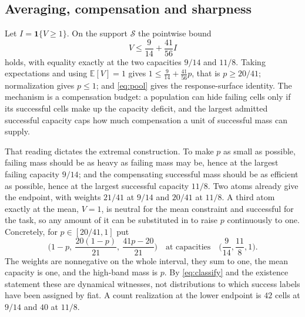\documentclass[11pt]{article}
\theoremstyle{definition}
\newcommand{\E}{\mathbb E}
\newcommand{\ind}{\mathbf 1}
\begin{document}
\subsection{Averaging, compensation and sharpness}
Let $I=\ind\{V\ge1\}$. On the support $\mathcal S$ the pointwise bound
\begin{equation}\label{eq:majorant}
  V\le\frac9{14}+\frac{41}{56}I
\end{equation}
holds, with equality exactly at the two capacities $9/14$ and $11/8$. Taking
expectations and using $\E[V]=1$ gives $1\le\frac9{14}+\frac{41}{56}p$, that
is $p\ge20/41$; normalization gives $p\le1$; and \eqref{eq:pool} gives the
response-surface identity. The mechanism is a compensation budget: a population
can hide failing cells only if its successful cells make up the capacity
deficit, and the largest admitted successful capacity caps how much
compensation a unit of successful mass can supply.

That reading dictates the extremal construction. To make $p$ as small as
possible, failing mass should be as heavy as failing mass may be, hence at the
largest failing capacity $9/14$; and the compensating successful mass should be
as efficient as possible, hence at the largest successful capacity $11/8$. Two
atoms already give the endpoint, with weights $21/41$ at $9/14$ and $20/41$ at
$11/8$. A third atom exactly at the mean, $V=1$, is neutral for the mean
constraint and successful for the task, so any amount of it can be substituted
in to raise $p$ continuously to one. Concretely, for $p\in[20/41,1]$ put
\begin{equation}\label{eq:witness}
  \Big(1-p,\ \frac{20(1-p)}{21},\ \frac{41p-20}{21}\Big)
  \quad\text{at capacities}\quad\Big(\frac9{14},\frac{11}8,1\Big).
\end{equation}
The weights are nonnegative on the whole interval, they sum to one, the mean
capacity is one, and the high-band mass is $p$. By \eqref{eq:classify} and the
existence statement these are dynamical witnesses, not distributions to which
success labels have been assigned by fiat. A count realization at the lower
endpoint is $42$ cells at $9/14$ and $40$ at $11/8$.
\end{document}
